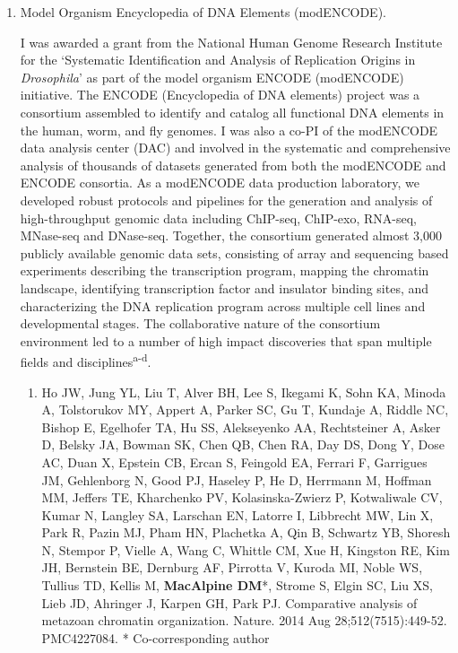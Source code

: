 \documentclass{update_nihbiosketch}
\newcommand\dros{{\itshape Drosophila}\xspace}
\begin{document}
\begin{enumerate}


\item Model Organism Encyclopedia of DNA Elements (modENCODE).

\noindent I was awarded a grant from the National Human Genome Research Institute for the `Systematic Identification and Analysis of Replication Origins in \dros' as part of the model organism ENCODE (modENCODE) initiative. The ENCODE (Encyclopedia of DNA elements) project was a consortium assembled to identify and catalog all functional DNA elements in the human, worm, and fly genomes. I was also a co-PI of the modENCODE data analysis center (DAC) and involved in the systematic and comprehensive analysis of thousands of datasets generated from both the modENCODE and ENCODE consortia.  As a modENCODE data production laboratory, we developed robust protocols and pipelines for the generation and analysis of high-throughput genomic data including ChIP-seq, ChIP-exo, RNA-seq, MNase-seq and DNase-seq.  Together, the consortium generated almost 3,000 publicly available genomic data sets, consisting of array and sequencing based experiments describing the transcription program, mapping the chromatin landscape, identifying transcription factor and insulator binding sites, and characterizing the DNA replication program across multiple cell lines and developmental stages.  The collaborative nature of the consortium environment led to a number of high impact discoveries that span multiple fields and disciplines\textsuperscript{a-d}.

  
\begin{enumerate}
\setlength\itemsep{0.35em}

\item Ho JW, Jung YL, Liu T, Alver BH, Lee S, Ikegami K, Sohn KA, Minoda A, Tolstorukov MY, Appert A, Parker SC, Gu T, Kundaje A, Riddle NC, Bishop E, Egelhofer TA, Hu SS, Alekseyenko AA, Rechtsteiner A, Asker D, Belsky JA, Bowman SK, Chen QB, Chen RA, Day DS, Dong Y, Dose AC, Duan X, Epstein CB, Ercan S, Feingold EA, Ferrari F, Garrigues JM, Gehlenborg N, Good PJ, Haseley P, He D, Herrmann M, Hoffman MM, Jeffers TE, Kharchenko PV, Kolasinska-Zwierz P, Kotwaliwale CV, Kumar N, Langley SA, Larschan EN, Latorre I, Libbrecht MW, Lin X, Park R, Pazin MJ, Pham HN, Plachetka A, Qin B, Schwartz YB, Shoresh N, Stempor P, Vielle A, Wang C, Whittle CM, Xue H, Kingston RE, Kim JH, Bernstein BE, Dernburg AF, Pirrotta V, Kuroda MI, Noble WS, Tullius TD, Kellis M, \textbf{MacAlpine DM}*, Strome S, Elgin SC, Liu XS, Lieb JD, Ahringer J, Karpen GH, Park PJ. Comparative analysis of metazoan chromatin organization. Nature. 2014 Aug 28;512(7515):449-52. PMC4227084. * Co-corresponding author


\end{enumerate}
\end{enumerate}
\end{document}
